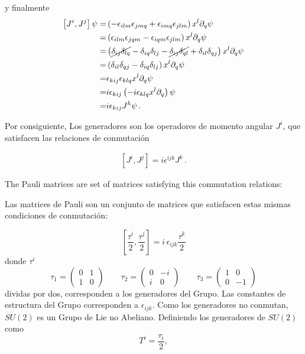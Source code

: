 y finalmente
\begin{align*}
  \left[ J^i,J^j \right]\psi  =& \left(-\epsilon_{ilm}\epsilon_{jmq}+\epsilon_{imq}\epsilon_{jlm}  \right) x^{l}\partial_q\psi \nonumber\\
   =& \left(\epsilon_{ilm}\epsilon_{jqm}-\epsilon_{iqm}\epsilon_{jlm}  \right) x^{l}\partial_q\psi \nonumber\\
   =& \left(\cancel{\delta_{ij}\delta_{lq}}-\delta_{iq}\delta_{lj}-\cancel{\delta_{ij}\delta_{ql}}+\delta_{il}\delta_{qj}  \right) x^{l}\partial_q\psi \nonumber\\
  =& \left(\delta_{il}\delta_{qj}-\delta_{iq}\delta_{lj}  \right) x^{l}\partial_q\psi \nonumber\\
  =& \epsilon_{kij}\epsilon_{klq} x^{l}\partial_q\psi \nonumber\\
  =&i \epsilon_{kij}\left(-i\epsilon_{klq} x^{l}\partial_q  \right)\psi \nonumber\\
  =&i \epsilon_{kij}J^{k}\psi \,.
\end{align*}

Por consiguiente, Los generadores son los operadores de momento angular $ J^i$, que satisfacen las relaciones de conmutación

\begin{align}
\label{eq:rotgr}
  \left[J^i,J^j\right]=i\epsilon^{ijk}J^k\,.
\end{align}
\begin{english}
  The Pauli matrices are set of matrices satisfying this commutation relations:
\end{english}
\begin{spanish}
Las matrices de Pauli son un conjunto de matrices que satisfacen estas mismas condiciones de conmutación: 
\end{spanish}
\begin{equation}
  \label{eq:paulialg}
  \left[\frac{\tau^i}{2},\frac{\tau^j}{2} \right]=i\,\epsilon_{ijk}\frac{\tau^k}{2}
\end{equation}
donde $\tau^i$ 
\begin{equation}
  \label{eq:paulimatr}
  \tau_1=
  \begin{pmatrix}
    0&1\\
    1&0
  \end{pmatrix} \qquad
 \tau_2=
  \begin{pmatrix}
    0&-i\\
    i&0
  \end{pmatrix}\qquad 
 \tau_3=
  \begin{pmatrix}
    1&0\\
    0&-1
  \end{pmatrix}
 \end{equation}
dividas por dos, corresponden a los generadores del Grupo. Las constantes de estructura del Grupo corresponden a $\epsilon_{ijk}$. Como los generadores no conmutan, $SU(2)$ es un Grupo de Lie no Abeliano. Definiendo los generadores de $SU(2)$ como
\begin{equation}
  T^i=\frac{\tau_i}{2},
\end{equation}

